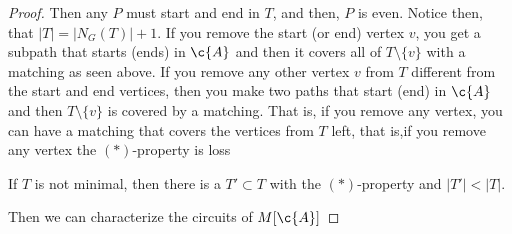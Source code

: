 \begin{proof}
    Then any $P$ must start and end in $T$, and then, $P$ is even. Notice then, that $|T| = |N_G(T)| + 1$. 
    If you remove the start (or end) vertex $v$, you get a subpath that starts (ends) in $\c{A}$ and then it covers all of $T \setminus \{v\}$ with 
    a matching as seen above. If you remove any other vertex $v$ from $T$ different from the start and end vertices, then you make two paths that 
    start (end) in $\c{A}$ and then $T \setminus \{v\}$ is covered by a matching. That is, if you remove any vertex, you can have a matching that 
    covers the vertices from $T$ left, that is,if you remove any vertex the $(*)$-property is loss \pn 
    
    If $T$ is not minimal, then there is a $T' \subset T$ with the $(*)$-property and $|T'| < |T|$.
    
    Then we can characterize the circuits of $M[\c{A}]$
\end{proof}